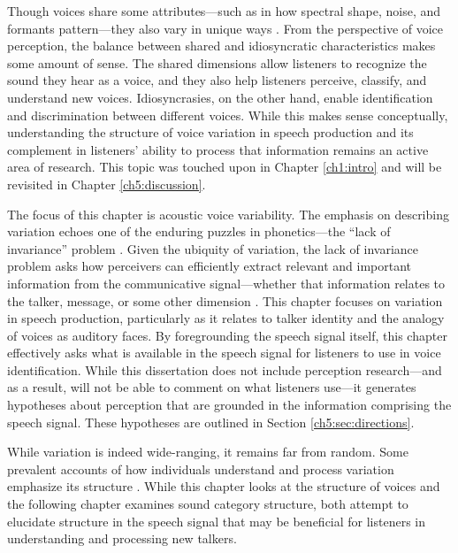 Though voices share some attributes---such as in how spectral shape, noise, and formants pattern---they also vary in unique ways \citep{lee_2019_acoustic}. From the perspective of voice perception, the balance between shared and idiosyncratic characteristics makes some amount of sense. The shared dimensions allow listeners to recognize the sound they hear as a voice, and they also help listeners perceive, classify, and understand new voices. Idiosyncrasies, on the other hand, enable identification and discrimination between different voices. While this makes sense conceptually, understanding the structure of voice variation in speech production and its complement in listeners' ability to process that information remains an active area of research. This topic was touched upon in Chapter \ref{ch1:intro} and will be revisited in Chapter \ref{ch5:discussion}.

The focus of this chapter is acoustic voice variability. The emphasis on describing variation echoes one of the enduring puzzles in phonetics---the ``lack of invariance'' problem \citep{liberman_1967_perception}. Given the ubiquity of variation, the lack of invariance problem asks how perceivers can efficiently extract relevant and important information from the communicative signal---whether that information relates to the talker, message, or some other dimension \citep{kleinschmidt_2018_sociolinguistic}. This chapter focuses on variation in speech production, particularly as it relates to talker identity and the analogy of voices as auditory faces. By foregrounding the speech signal itself, this chapter effectively asks what is available in the speech signal for listeners to use in voice identification. While this dissertation does not include perception research---and as a result, will not be able to comment on what listeners use---it generates hypotheses about perception that are grounded in the information comprising the speech signal. These hypotheses are outlined in Section \ref{ch5:sec:directions}.

While variation is indeed wide-ranging, it remains far from random. Some prevalent accounts of how individuals understand and process variation emphasize its structure \citep[e.g.,][]{chodroff_2017_structure, lee_2019_acoustic}. While this chapter looks at the structure of voices and the following chapter examines sound category structure, both attempt to elucidate structure in the speech signal that may be beneficial for listeners in understanding and processing new talkers. 

